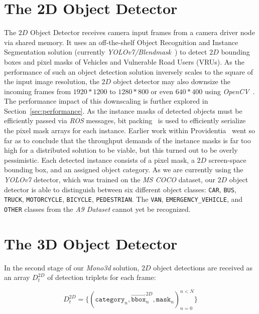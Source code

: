
\section{The 2D Object Detector}
\label{sec:segmentation}

The $2D$ Object Detector receives camera input frames from a camera driver node via shared memory.
It uses an off-the-shelf Object Recognition and Instance Segmentation solution (currently \textit{YOLOv7/Blendmask}~\cite{wang2022yolov7, chen2020blendmask}) to detect $2D$ bounding boxes and pixel masks of Vehicles and Vulnerable Road Users (VRUs).
As the performance of such an object detection solution inversely scales to the square of the input image resolution, the $2D$ object detector may also downsize the incoming frames from $1920*1200$ to $1280*800$ or even $640*400$ using \textit{OpenCV}~\cite{opencv_library}.
The performance impact of this downscaling is further explored in Section~\ref{sec:performance}.
As the instance masks of detected objects must be efficiently passed via \textit{ROS} messages, bit packing~\cite{5219512} is used to efficiently serialize the pixel mask arrays for each instance.
Earlier work within Providentia~\cite{leonthesis} went so far as to conclude that the throughput demands of the instance masks is far too high for a distributed solution to be viable, but this turned out to be overly pessimistic.
Each detected instance consists of a pixel mask, a $2D$ screen-space bounding box, and an assigned object category.
As we are currently using the \textit{YOLOv7} detector, which was trained on the \textit{MS COCO} dataset, our $2D$ object detector is able to distinguish between six different object classes: \texttt{CAR}, \texttt{BUS}, \texttt{TRUCK}, \texttt{MOTORCYCLE}, \texttt{BICYCLE}, \texttt{PEDESTRIAN}.
The \texttt{VAN}, \texttt{EMERGENCY\_VEHICLE}, and \texttt{OTHER} classes from the \textit{A9 Dataset} cannot yet be recognized.

\section{The 3D Object Detector}
\label{sec:mono3doverview}

In the second stage of our \textit{Mono3d} solution, $2D$ object detections are received as an array $D^{2D}_t$ of detection triplets for each frame:

\[
    D^{2D}_t = \{ (\mathtt{category}_n, \overrightarrow{\mathtt{bbox}}^{2D}_n, \mathtt{mask}_n)^{n < N}_{n=0}\}
\]

